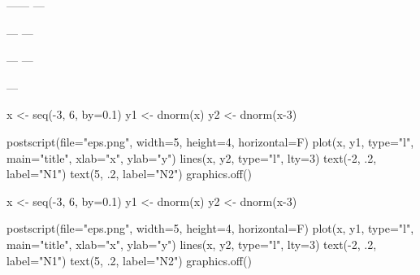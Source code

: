 \documentclass[11pt]{article}
\begin{document}
\begin{center}
------
---\begin{turn}{30}
\end{turn}---
---\begin{rotate}{30}
\end{rotate}---
---\begin{sideways}
\end{sideways}---
\end{center}

x <- seq(-3, 6, by=0.1)
y1 <- dnorm(x)
y2 <- dnorm(x-3)

postscript(file="eps.png", width=5, height=4, horizontal=F)
plot(x, y1, type="l", main="title", xlab="x", ylab="y")
lines(x, y2, type="l", lty=3)
text(-2, .2, label="N1")
text(5, .2, label="N2")
graphics.off()

x <- seq(-3, 6, by=0.1)
y1 <- dnorm(x)
y2 <- dnorm(x-3)

postscript(file="eps.png", width=5, height=4, horizontal=F)
plot(x, y1, type="l", main="title", xlab="x", ylab="y")
lines(x, y2, type="l", lty=3)
text(-2, .2, label="N1")
text(5, .2, label="N2")
graphics.off()
\end{document}
